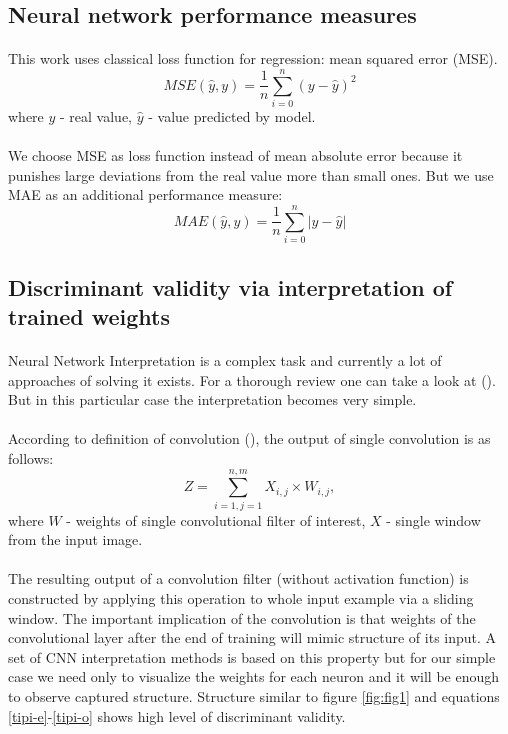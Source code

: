 \documentclass{llncs}
\begin{document}
\subsection{Neural network performance measures}
\paragraph{}
This work uses classical loss function for regression: mean squared error (MSE).
\begin{equation}
	MSE(\hat{y}, y) = \frac{1}{n}\sum_{i=0}^n(y-\hat{y})^2
\end{equation}
where $y$ - real value, $\hat{y}$ - value predicted by model.
\paragraph{}
We choose MSE as loss function instead of mean absolute error because it punishes large deviations from the real value more than small ones. But we use MAE as an additional performance measure:
\begin{equation}
	MAE(\hat{y}, y) = \frac{1}{n}\sum_{i=0}^n|y-\hat{y}|
\end{equation}

\subsection{Discriminant validity via interpretation of trained weights}
\paragraph{}
Neural Network Interpretation is a complex task and currently a lot of approaches of solving it exists. For a thorough review one can take a look at (\cite{montavon2017methods}). But in this particular case the interpretation becomes very simple.
\paragraph{}
According to definition of convolution (\cite{goodfellow2016deep}), the output of single convolution is as follows:
\begin{equation}
	Z = \sum_{i=1,j=1}^{n,m} X_{i,j} \times W_{i,j},
\end{equation}
where \(W\) - weights of single convolutional filter of interest, \(X\) - single window from the input image.
\paragraph{}
The resulting output of a convolution filter (without activation function) is constructed by applying this operation to whole input example via a sliding window. The important implication of the convolution is that weights of the convolutional layer after the end of training will mimic structure of its input. A set of CNN interpretation methods is based on this property but for our simple case we need only to visualize the weights for each neuron and it will be enough to observe captured structure. Structure similar to figure \ref{fig:fig1} and equations \ref{tipi-e}-\ref{tipi-o} shows high level of discriminant validity.
\end{document}
